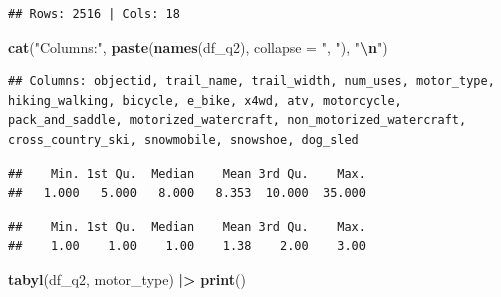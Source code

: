 \documentclass[
]{article}
\newenvironment{Shaded}{\begin{snugshade}}{\end{snugshade}}
\newcommand{\AttributeTok}[1]{\textcolor[rgb]{0.13,0.29,0.53}{#1}}
\newcommand{\FunctionTok}[1]{\textcolor[rgb]{0.13,0.29,0.53}{\textbf{#1}}}
\newcommand{\NormalTok}[1]{#1}
\newcommand{\SpecialCharTok}[1]{\textcolor[rgb]{0.81,0.36,0.00}{\textbf{#1}}}
\newcommand{\StringTok}[1]{\textcolor[rgb]{0.31,0.60,0.02}{#1}}
\begin{document}
\begin{verbatim}
## Rows: 2516 | Cols: 18
\end{verbatim}

\begin{Shaded}
\begin{Highlighting}[]
\FunctionTok{cat}\NormalTok{(}\StringTok{"Columns:"}\NormalTok{, }\FunctionTok{paste}\NormalTok{(}\FunctionTok{names}\NormalTok{(df\_q2), }\AttributeTok{collapse =} \StringTok{", "}\NormalTok{), }\StringTok{"}\SpecialCharTok{\textbackslash{}n}\StringTok{"}\NormalTok{)}
\end{Highlighting}
\end{Shaded}

\begin{verbatim}
## Columns: objectid, trail_name, trail_width, num_uses, motor_type, hiking_walking, bicycle, e_bike, x4wd, atv, motorcycle, pack_and_saddle, motorized_watercraft, non_motorized_watercraft, cross_country_ski, snowmobile, snowshoe, dog_sled
\end{verbatim}

\begin{Shaded}
\end{Shaded}

\begin{verbatim}
##    Min. 1st Qu.  Median    Mean 3rd Qu.    Max. 
##   1.000   5.000   8.000   8.353  10.000  35.000
\end{verbatim}

\begin{Shaded}
\end{Shaded}

\begin{verbatim}
##    Min. 1st Qu.  Median    Mean 3rd Qu.    Max. 
##    1.00    1.00    1.00    1.38    2.00    3.00
\end{verbatim}

\begin{Shaded}
\begin{Highlighting}[]
\FunctionTok{tabyl}\NormalTok{(df\_q2, motor\_type)   }\SpecialCharTok{|\textgreater{}} \FunctionTok{print}\NormalTok{()}
\end{Highlighting}
\end{Shaded}
\end{document}
